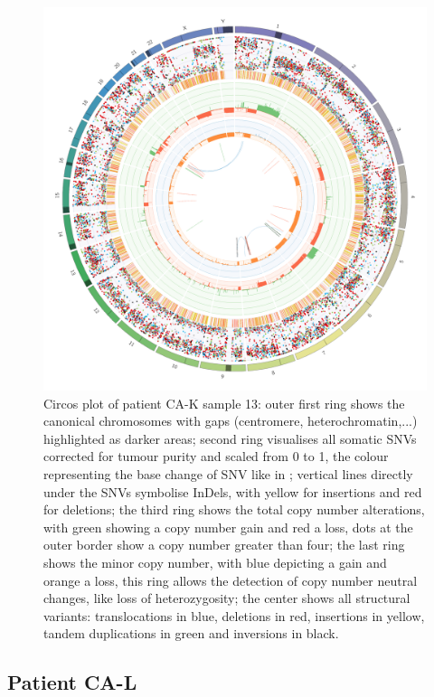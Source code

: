 \begin{figure}[ht]
\centering
\includegraphics[width=.99\linewidth]{Figures/CASCADE/CA82/CA82-13.circos.png}
\caption[Circos plot of patient CA-K sample 13]{Circos plot of patient CA-K sample 13: outer first ring shows the canonical chromosomes with gaps (centromere, heterochromatin,...) highlighted as darker areas; second ring visualises all somatic SNVs corrected for tumour purity and scaled from 0 to 1, the colour representing the base change of SNV like in \protect\textcite{Alexandrov2013}; vertical lines directly under the SNVs symbolise InDels, with yellow for insertions and red for deletions; the third ring shows the total copy number alterations, with green showing a copy number gain and red a loss, dots at the outer border show a copy number greater than four; the last ring shows the minor copy number, with blue depicting a gain and orange a loss, this ring allows the detection of copy number neutral changes, like loss of heterozygosity; the center shows all structural variants: translocations in blue, deletions in red, insertions in yellow, tandem duplications in green and inversions in black.} \label{fig:ca82.13circos}
\end{figure}




\cleardoublepage
\subsection{Patient CA-L}

